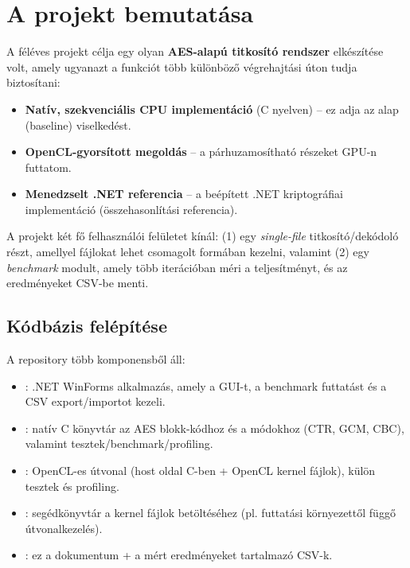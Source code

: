 \chapter{A projekt bemutatása}

A féléves projekt célja egy olyan \textbf{AES-alapú titkosító rendszer} elkészítése volt,
amely ugyanazt a funkciót több különböző végrehajtási úton tudja biztosítani:

\begin{itemize}
  \item \textbf{Natív, szekvenciális CPU implementáció} (C nyelven) -- ez adja az alap (baseline) viselkedést.
  \item \textbf{OpenCL-gyorsított megoldás} -- a párhuzamosítható részeket GPU-n futtatom.
  \item \textbf{Menedzselt .NET referencia} -- a beépített .NET kriptográfiai implementáció (összehasonlítási referencia).
\end{itemize}

A projekt két fő felhasználói felületet kínál: (1) egy \emph{single-file} titkosító/dekódoló részt,
amellyel fájlokat lehet csomagolt formában kezelni, valamint (2) egy \emph{benchmark} modult,
amely több iterációban méri a teljesítményt, és az eredményeket CSV-be menti.

\section{Kódbázis felépítése}

A repository több komponensből áll:

\begin{itemize}
  \item \textbf{}: .NET WinForms alkalmazás, amely a GUI-t, a benchmark futtatást és a CSV export/importot kezeli.
  \item \textbf{}: natív C könyvtár az AES blokk-kódhoz és a módokhoz (CTR, GCM, CBC), valamint tesztek/benchmark/profiling.
  \item \textbf{}: OpenCL-es útvonal (host oldal C-ben + OpenCL kernel fájlok), külön tesztek és profiling.
  \item \textbf{}: segédkönyvtár a kernel fájlok betöltéséhez (pl. futtatási környezettől függő útvonalkezelés).
  \item \textbf{}: ez a dokumentum + a mért eredményeket tartalmazó CSV-k.
\end{itemize}

